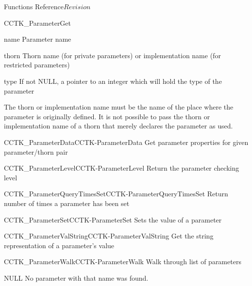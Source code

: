 \begin{cactuspart}{ Functions Reference}{}{$Revision$}
\begin{FunctionDescription}{CCTK\_ParameterGet}
\begin{ParameterSection}
\begin{Parameter}{name}
Parameter name
\end{Parameter}
\begin{Parameter}{thorn}
Thorn name (for private parameters) or implementation name (for
restricted parameters)
\end{Parameter}
\begin{Parameter}{type}
If not NULL, a pointer to an integer which will hold the type of the
parameter
\end{Parameter}
\end{ParameterSection}

\begin{Discussion}
The thorn or implementation name must be the name of the place where
the parameter is originally defined.  It is not possible to pass the
thorn or implementation name of a thorn that merely declares the
parameter as used.
\end{Discussion}

\begin{SeeAlsoSection}
\begin{SeeAlso2}{CCTK\_ParameterData}{CCTK-ParameterData}
  Get parameter properties for given parameter/thorn pair
\end{SeeAlso2}
\begin{SeeAlso2}{CCTK\_ParameterLevel}{CCTK-ParameterLevel}
  Return the parameter checking level
\end{SeeAlso2}
\begin{SeeAlso2}{CCTK\_ParameterQueryTimesSet}{CCTK-ParameterQueryTimesSet}
  Return number of times a parameter has been set
\end{SeeAlso2}
\begin{SeeAlso2}{CCTK\_ParameterSet}{CCTK-ParameterSet}
  Sets the value of a parameter
\end{SeeAlso2}
\begin{SeeAlso2}{CCTK\_ParameterValString}{CCTK-ParameterValString}
  Get the string representation of a parameter's value
\end{SeeAlso2}
\begin{SeeAlso2}{CCTK\_ParameterWalk}{CCTK-ParameterWalk}
  Walk through list of parameters
\end{SeeAlso2}
\end{SeeAlsoSection}

\begin{ErrorSection}
\begin{Error}{NULL}
No parameter with that name was found.
\end{Error}
\end{ErrorSection}
\end{FunctionDescription}



\end{cactuspart}
